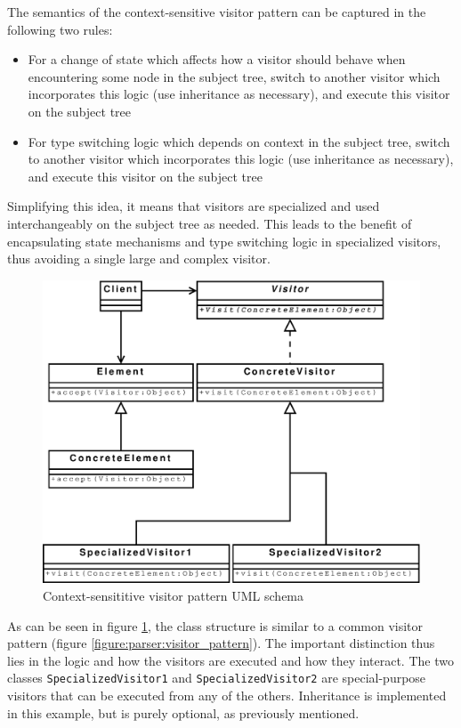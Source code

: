 The semantics of the context-sensitive visitor pattern can be captured in the
following two rules:
\begin{itemize}
  \item For a change of state which affects how a visitor should behave when
  encountering some node in the subject tree, switch to another visitor which
  incorporates this logic (use inheritance as necessary), and execute this
  visitor on the subject tree
  \item For type switching logic which depends on context in the subject tree,
  switch to another visitor which incorporates this logic (use inheritance as
  necessary), and execute this visitor on the subject tree
\end{itemize}

Simplifying this idea, it means that visitors are specialized and used
interchangeably on the subject tree as needed. This leads to the benefit of
encapsulating state mechanisms and type switching logic in specialized
visitors, thus avoiding a single large and complex visitor.

\begin{figure}[h]
  \centering
    \includegraphics[scale=0.40]{diagrams/context_visitor_pattern} 
  \caption{Context-sensititive visitor pattern UML schema}
  \label{figure:parser:context_visitor_pattern}
\end{figure}

As can be seen in figure \ref{figure:parser:context_visitor_pattern}, the
class structure is similar to a common visitor pattern (figure
\ref{figure:parser:visitor_pattern}). The important distinction thus lies in
the logic and how the visitors are executed and how they interact. The two
classes \verb!SpecializedVisitor1! and \verb!SpecializedVisitor2! are
special-purpose visitors that can be executed from any of the others.
Inheritance is implemented in this example, but is purely optional, as
previously mentioned.